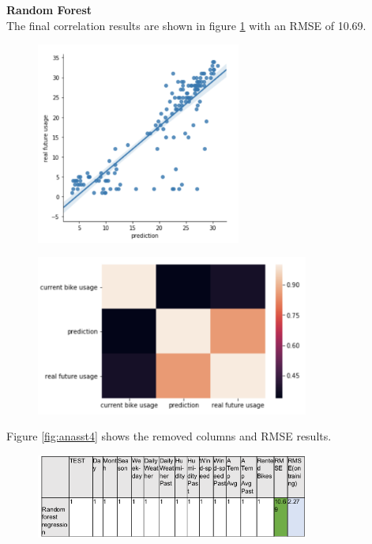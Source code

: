 \textbf{Random Forest}\\
The final correlation results are shown in figure \ref{fig:image19} with an RMSE of 10.69.
\begin{figure}[H]
\centering
\includegraphics[width=0.6\textwidth]{media/image19}\label{fig:image19}
\label{fig:image19}
\end{figure}
\begin{figure}[H]
\centering
\includegraphics[width=0.8\textwidth]{media/image1a}\label{fig:image1a}
\label{fig:image1a}
\end{figure}
Figure \ref{fig:anasst4} shows the removed columns and RMSE results.
\begin{figure}[H]
\centering
\includegraphics[width=0.8\textwidth]{media/anasst5}\label{fig:anasst5}
\label{fig:anasst5}
\end{figure}

